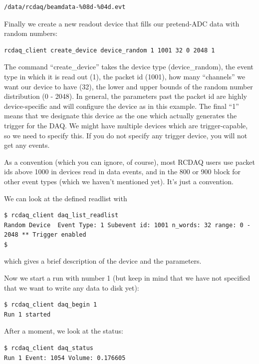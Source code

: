 \documentclass{article}[11pt]
\begin{document}
\begin{verbatim}
/data/rcdaq/beamdata-%08d-%04d.evt 
\end{verbatim}


Finally we create a new readout device that fills our pretend-ADC data
with random numbers:

\begin{verbatim}
rcdaq_client create_device device_random 1 1001 32 0 2048 1
\end{verbatim}

The command ``create\_device'' takes the device type (device\_random),
the event type in which it is read out (1), the packet id (1001), how
many ``channels'' we want our device to have (32), the lower and upper
bounds of the random number distribution (0 - 2048). In general, the
parameters past the packet id are highly device-specific and will
configure the device as in this example.  The final ``1'' means that
we designate this device as the one which actually generates the
trigger for the DAQ. We might have multiple devices which are
trigger-capable, so we need to specify this. If you do not specify any
trigger device, you will not get any events.

As a convention (which you can ignore, of course), most RCDAQ users
use packet ids above 1000 in devices read in data events, and in the
800 or 900 block for other event types (which we haven't mentioned
yet). It's just a convention.


We can look at the defined readlist with  

\begin{verbatim}
$ rcdaq_client daq_list_readlist
Random Device  Event Type: 1 Subevent id: 1001 n_words: 32 range: 0 - 2048 ** Trigger enabled
$ 
\end{verbatim}

which gives a brief description of the device and the parameters.

Now we start a run with number 1 (but keep in mind that we have not
specified that we want to write any data to disk yet):

\begin{verbatim}
$ rcdaq_client daq_begin 1
Run 1 started
\end{verbatim}

After a moment, we look at the status:

\begin{verbatim}
$ rcdaq_client daq_status 
Run 1 Event: 1054 Volume: 0.176605
\end{verbatim}
\end{document}

